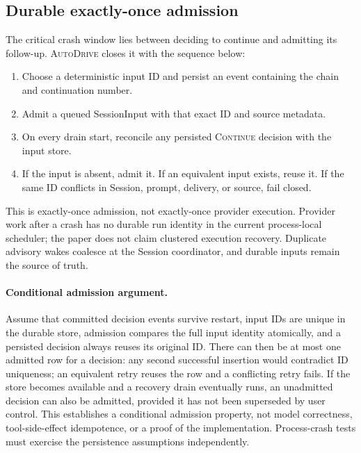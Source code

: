 \documentclass[sigconf,nonacm]{acmart}
\newcommand{\system}{\textsc{AutoDrive}}
\newcommand{\continueaction}{\textsc{Continue}}
\begin{document}
\subsection{Durable exactly-once admission}

The critical crash window lies between deciding to continue and admitting its follow-up. \system{} closes it with the sequence below:

\begin{enumerate}[leftmargin=*]
  \item Choose a deterministic input ID and persist an  event containing the chain and continuation number.
  \item Admit a queued SessionInput with that exact ID and source metadata.
  \item On every drain start, reconcile any persisted \continueaction{} decision with the input store.
  \item If the input is absent, admit it. If an equivalent input exists, reuse it. If the same ID conflicts in Session, prompt, delivery, or source, fail closed.
\end{enumerate}

This is exactly-once admission, not exactly-once provider execution. Provider work after a crash has no durable run identity in the current process-local scheduler; the paper does not claim clustered execution recovery. Duplicate advisory wakes coalesce at the Session coordinator, and durable inputs remain the source of truth.

\paragraph{Conditional admission argument.}
Assume that committed decision events survive restart, input IDs are unique in the durable store, admission compares the full input identity atomically, and a persisted decision always reuses its original ID. There can then be at most one admitted row for a decision: any second successful insertion would contradict ID uniqueness; an equivalent retry reuses the row and a conflicting retry fails. If the store becomes available and a recovery drain eventually runs, an unadmitted decision can also be admitted, provided it has not been superseded by user control. This establishes a conditional admission property, not model correctness, tool-side-effect idempotence, or a proof of the implementation. Process-crash tests must exercise the persistence assumptions independently.
\end{document}
